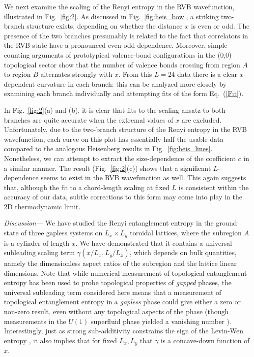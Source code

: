 \documentclass[prl,aps,twocolumn,floatfix,amsmath,amssymb,superscriptaddress,tightenlines]{revtex4}
\begin{document}
We next examine the scaling of the Renyi entropy in the RVB wavefunction, illustrated in Fig.~{\ref{fig:2}}.  
As discussed in Fig.~\ref{fig:heis_bow}, a striking two-branch structure exists, depending on whether the distance $x$ is even or odd.
The presence of the two branches presumably is related to the fact that correlators in the RVB state have a pronounced even-odd dependence. Moreover, simple counting arguments of prototypical valence-bond configurations in the (0,0) topological sector \cite{RVB1,RVB2} show that the number of valence bonds crossing from region $A$ to region $B$ alternates strongly with $x$.  From this $L=24$ data there is a clear $x$-dependent curvature in each branch: this can be analyzed more closely by examining each branch individually and attempting fits of the form Eq.~(\ref{Fit}).  

In Fig.~{\ref{fig:2}}(a) and (b), it is clear that fits to the scaling
ansatz to both branches are quite accurate when the extremal values of
$x$ are excluded.   Unfortunately, due to the two-branch structure of
the Renyi entropy in the RVB wavefunction, each curve on this plot has
essentially half the usable data compared to the analogous Heisenberg
results in Fig.~\ref{fig:heis_lines}.  Nonetheless, we can attempt to
extract the size-dependence of the coefficient $c$ in a similar
manner.  The result (Fig.~\ref{fig:2}(c)) shows that a significant
$L$-dependence seems to exist in the RVB wavefunction as well.  This
again suggests that, although the fit to a chord-length scaling at
fixed $L$ is consistent within the accuracy of our data, subtle corrections to this form may come into play in the 2D thermodynamic limit.

{\it Discussion---} We have studied the Renyi entanglement entropy in the ground state of three gapless systems on $L_x\times L_y$ toroidal lattices, where the subregion $A$ is a cylinder of length $x$.  We have  
demonstrated that it contains a universal subleading scaling term $\gamma(x/L_x,L_y/L_x)$, which depends on bulk quantities, namely the dimensionless aspect ratios of the subregion and the lattice linear dimensions.  
Note that while numerical measurement of topological entanglement entropy\cite{LW,KP} has been used to probe topological properties of {\it gapped} phases\cite{isakov}, the universal subleading term considered here means that a measurement of topological entanglement entropy in a {\it gapless} phase could give either a zero or non-zero result, even without any topological aspects of the phase (though measurements in the $U(1)$ superfluid phase yielded a vanishing number \cite{isakov}).
Interestingly, just as strong sub-additivity constrains the sign of the Levin-Wen entropy \cite{LW}, it also implies that for fixed $L_x,L_y$ that $\gamma$ is a concave-down function of $x$.
\end{document}
